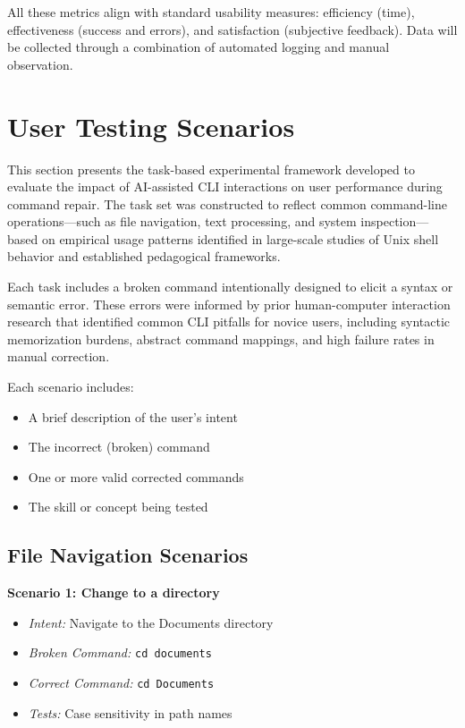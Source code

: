 All these metrics align with standard usability measures: efficiency (time), effectiveness (success and errors), and satisfaction (subjective feedback). Data will be collected through a combination of automated logging and manual observation.

\section{User Testing Scenarios}

This section presents the task-based experimental framework developed to evaluate the impact of AI-assisted CLI interactions on user performance during command repair. The task set was constructed to reflect common command-line operations—such as file navigation, text processing, and system inspection—based on empirical usage patterns identified in large-scale studies of Unix shell behavior and established pedagogical frameworks.

Each task includes a broken command intentionally designed to elicit a syntax or semantic error. These errors were informed by prior human-computer interaction research that identified common CLI pitfalls for novice users, including syntactic memorization burdens, abstract command mappings, and high failure rates in manual correction.

Each scenario includes:
\begin{itemize}
	\item A brief description of the user's intent
	\item The incorrect (broken) command
	\item One or more valid corrected commands
	\item The skill or concept being tested
\end{itemize}

\subsection{File Navigation Scenarios}

\textbf{Scenario 1: Change to a directory}
\begin{itemize}
	\item \textit{Intent:} Navigate to the Documents directory
	\item \textit{Broken Command:} \texttt{cd documents}
	\item \textit{Correct Command:} \texttt{cd Documents}
	\item \textit{Tests:} Case sensitivity in path names
\end{itemize}

